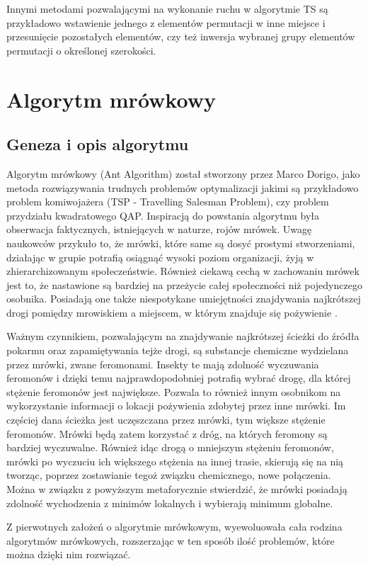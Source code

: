 Innymi metodami pozwalającymi na wykonanie ruchu w algorytmie TS są przykładowo wstawienie jednego z elementów permutacji w inne miejsce i przesunięcie pozostałych elementów, czy też inwersja wybranej grupy elementów permutacji o określonej szerokości.

\section{Algorytm mrówkowy}
\label{sec:mrowka}
\subsection{Geneza i opis algorytmu}
Algorytm mrówkowy (Ant Algorithm) został stworzony przez Marco Dorigo, jako metoda rozwiązywania trudnych problemów optymalizacji jakimi są przykładowo problem komiwojażera (TSP - Travelling Salesman Problem), czy problem przydziału kwadratowego QAP. Inspiracją do powstania algorytmu była obserwacja faktycznych, istniejących w naturze, rojów mrówek. Uwagę naukowców przykuło to, że mrówki, które same są dosyć prostymi stworzeniami, działając w grupie potrafią osiągnąć wysoki poziom organizacji, żyją w zhierarchizowanym społeczeństwie. Również ciekawą cechą w zachowaniu mrówek jest to, że nastawione są bardziej na przeżycie całej społeczności niż pojedynczego osobnika. Posiadają one także niespotykane umiejętności znajdywania najkrótszej drogi pomiędzy mrowiskiem a miejscem, w którym znajduje się pożywienie \cite{ANT_DISC}.

Ważnym czynnikiem, pozwalającym na znajdywanie najkrótszej ścieżki do źródła pokarmu oraz zapamiętywania tejże drogi, są substancje chemiczne wydzielana przez mrówki, zwane feromonami. Insekty te mają zdolność wyczuwania feromonów i dzięki temu najprawdopodobniej potrafią wybrać drogę, dla której stężenie feromonów jest największe. Pozwala to również innym osobnikom na wykorzystanie informacji o lokacji pożywienia zdobytej przez inne mrówki. Im częściej dana ścieżka jest uczęszczana przez mrówki, tym większe stężenie feromonów. Mrówki będą zatem korzystać z dróg, na których feromony są bardziej wyczuwalne. Również idąc drogą o mniejszym stężeniu feromonów, mrówki po wyczuciu ich większego stężenia na innej trasie, skierują się na nią tworząc, poprzez zostawianie tegoż związku chemicznego, nowe połączenia. Można w związku z powyższym metaforycznie stwierdzić, że mrówki posiadają zdolność wychodzenia z minimów lokalnych i wybierają minimum globalne.

Z pierwotnych założeń o algorytmie mrówkowym, wyewoluowała cała rodzina algorytmów mrówkowych, rozszerzając w ten sposób ilość problemów, które można dzięki nim rozwiązać. 


